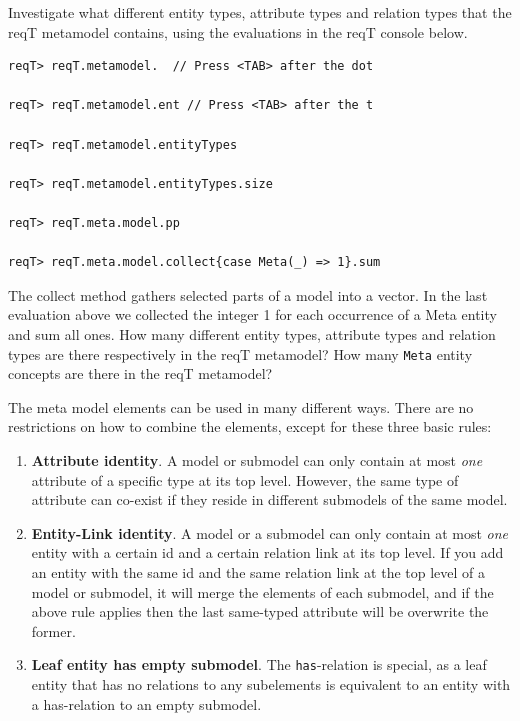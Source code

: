 \documentclass[11pt]{article}
\begin{document}
Investigate what different entity types, attribute types and relation types that the reqT metamodel contains, using the evaluations in the reqT console below. 

\begin{framed}
{\footnotesize\begin{verbatim}
reqT> reqT.metamodel.  // Press <TAB> after the dot

reqT> reqT.metamodel.ent // Press <TAB> after the t

reqT> reqT.metamodel.entityTypes

reqT> reqT.metamodel.entityTypes.size

reqT> reqT.meta.model.pp

reqT> reqT.meta.model.collect{case Meta(_) => 1}.sum
\end{verbatim}}
\noindent The collect method gathers selected parts of a model into a vector. In the last evaluation above we collected the integer 1 for each occurrence of a Meta entity and sum all ones.
\newline\newline 
\noindent
How many different entity types, attribute types and relation types are there respectively in the reqT metamodel? 
\newline
\newline \underline{\hspace{10cm}}
\newline\newline
How many \verb+Meta+ entity concepts are there in the reqT metamodel? 
\newline
\newline \underline{\hspace{10cm}}
\end{framed}

The meta model elements can be used in many different ways. There are no restrictions on how to combine the elements, except for these three basic rules:
\begin{enumerate}
\item {\bf Attribute identity}. A model or submodel can only contain at most {\it one} attribute of a specific type at its top level. However, the same type of attribute can co-exist if they reside in different submodels of the same model. 
\item {\bf Entity-Link identity}. A model or a submodel can only contain at most {\it one} entity with a certain id and a certain relation link at its top level. If you add an entity with the same id and the same relation link at the top level of a model or submodel, it will merge the elements of each submodel, and if the above rule applies then the last same-typed attribute will be overwrite the former. 
\item {\bf Leaf entity has empty submodel}. The \verb+has+-relation is special, as a leaf entity that has no relations to any subelements is equivalent to an entity with a has-relation to an empty submodel. 
\end{enumerate}
\end{document}
